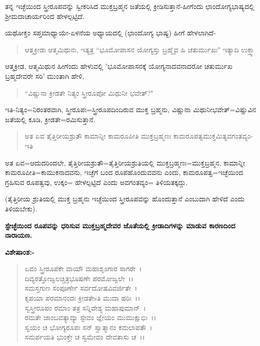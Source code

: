 ತನ್ನ ಇಚ್ಛೆಯಿಂದ ಸ್ತ್ರೀರೂಪವನ್ನು ಸ್ವೀಕರಿಸಿದ ಮುಕ್ತಬ್ರಹ್ಮನ ಜತೆಯಲ್ಲಿ ಕ್ರೀಡಿಸುತ್ತಾನೆ-ಹೀಗೆಂದು ಛಾಂದೋಗ್ಯಭಾಷ್ಯದಲ್ಲಿ ಶ‍್ರೀಮದಾಚಾರ್ಯರಿಂದ ಹೇಳಲ್ಪಟ್ಟಿದೆ.

ಯಥೋಕ್ತಂ ಸಪ್ತಮಾಧ್ಯಾಯೇ-ಏಳನೆಯ ಅಧ್ಯಾಯದಲ್ಲಿ (ಛಾಂದೋಗ್ಯ ಭಾಷ್ಯ) ಹೀಗೆ ಹೇಳಲಾಗಿದೆ-

\begin{verse}
ಆತ್ಮಕ್ರೀಡಃ ಆತ್ಮಮಿಥುನಃ, ಇತ್ಯತ್ರ “ಭೂಮೋಪಾಸನ ಯೋಗ್ಯಸ್ತು ಬ್ರಹ್ಮೈವ ಹಿ ಚತುರ್ಮುಖಃ" ಇತ್ಯಾದಿ ಉಕ್ತ್ವಾ
\end{verse}

ಆತ್ಮಕ್ರೀಡ, ಆತ್ಮಮಿಥುನ ಹೀಗೆಂದು ಹೇಳುವಲ್ಲಿ 'ಭೂಮೋಪಾಸನಕ್ಕೆ ಯೋಗ್ಯನಾದವನಾದರೋ ಚತುರ್ಮುಖ ಬ್ರಹ್ಮದೇವರೇ ಸರಿ' ಮುಂತಾಗಿ ಹೇಳಿ,

\begin{verse}
``ವಿಷ್ಣುನಾ ಕ್ರೀಡತೇ ನಿತ್ಯಂ ಸ್ತ್ರೀರೂಪೋ ಮಿಥುನೀ ಭವೇತ್?"
\end{verse}

ಇತಿ-ನಿತ್ಯಂ=ನಿರಂತರವಾಗಿ, ಸ್ತ್ರೀರೂಪಃ=ಸ್ತ್ರೀರೂಪದಿಂದಿರುವ ಮುಕ್ತ ಬ್ರಹ್ಮನು, ವಿಷ್ಣುನಾ ಮಿಥುನೀಭವೇತ್=ವಿಷ್ಣುವಿನ ಜತೆಯಲ್ಲಿ ಕೂಡಿ, ಕ್ರೀಡತೇ=ರಮಿಸುತ್ತಾನೆ.

\begin{verse}
ಅತ ಏವ ತೈತ್ತಿರೀಯಶ್ರುತೌ ಕಾಮಾನ್ನೀ ಕಾಮರೂಪೀತಿ ಮುಕ್ತಬ್ರಹ್ಮಣಃ ಕಾಮರೂಪತ್ವಮುಕ್ತಮಿತ್ಯವಗಂತವ್ಯಂ-ಇತಿ
\end{verse}

ಅತ ಏವ=ಆದುದರಿಂದಲೇ, ತೈತ್ತಿರೀಯಶ್ರುತೌ=ತೈತ್ತಿರೀಯಶ್ರುತಿಯಲ್ಲಿ ಮುಕ್ತಬ್ರಹ್ಮಣಃ=ಮುಕ್ತಬ್ರಹ್ಮನ, ಕಾಮಾನ್ನೀ ಕಾಮರೂಪೀತಿ=ಕಾಮುಕನಾದವನು, ಇಚ್ಛೆಗೆ ಬಂದ ರೂಪಹೊಂದುವವನು ಎಂದು, ಕಾಮರೂಪತ್ವ=ಇಚ್ಛೆಯಿಂದ ಗ್ರಹಿಸುವ ರೂಪತ್ವವು, ಉಕ್ಕಂ= ಹೇಳಲ್ಪಟ್ಟಿದೆ ಎಂದು ಅವಗಂತವ್ಯಂ= ತಿಳಿಯತಕ್ಕದ್ದು.

(ತೈತ್ತಿರೀಯ ಶ್ರುತಿಯಲ್ಲಿ ಮುಕ್ತ ಬ್ರಹ್ಮನು ಇಚ್ಛೆಯಿಂದ ಸ್ತ್ರೀರೂಪವನ್ನು ಹೊಂದುತ್ತಾನೆ ಎಂಬುದಾಗಿ ಹೇಳಿದೆ ಎಂದು ತಿಳಿಯಬೇಕು).

\begin{center}
\textbf{ಸ್ಟೇಚ್ಛೆಯಿಂದ ರೂಪವನ್ನು ಧರಿಸುವ ಮುಕ್ತಬ್ರಹ್ಮದೇವರ ಜೊತೆಯಲ್ಲಿ ಕ್ರೀಡಾದಿಗಳನ್ನು ಮಾಡುವ ಕಾರಣದಿಂದ ನಾರಾಯಣ.}
\end{center}

\noindent
\textbf{ವಿಶೇಷಾಂಶ:-}

\begin{verse}
ಏವಂ ಸ್ತ್ರೀರೂಪಕೇ ವಾಯೌ ಮಹಾಶೃಂಗಾರ ಸಾಗರೇ~।\\ ದಿವ್ಯರತ್ತೋಜ್ವಲಚ್ಚಿತ್ರಭೂಷಣೇ ಪರಮೋಜ್ವಲೇ~।।\\ ಸಮಸ್ತಗುಣ ಸಂಪೂರ್ಣೇ ಸರ್ವದೋಷವಿವರ್ಜಿತೇ~।\\ ಕೃಪಯಾ ಪರಮಾನಂದಃ ಕ್ರೀಡತೇsತಿ ಮುದಾ ಹರಿಃ~।।\\ ಸ್ವಸ್ತ್ರೀರೂಪಂ ರಮಾಂ ತತ್ರ ಸನ್ನಿವೇಶ್ಯ ಮಹಾಪುಮಾನ್~।\\ ರಮತೇ ಜಾಂಬವತ್ಯಾದ್ಯಾ ಸ್ಟೇವಂ ಜ್ಞೇಯಂ ಮುಮುಕ್ಷುಭಿಃ~।।\\ ಸ್ವಯಂ ಚ ಭೋಗ್ಯರೂಪಃ ಸನ್ ಸ್ವಾತ್ಮಾನಂ ಕಮಲಾಪತೌ~।\\ ಸಮರ್ಪಯತಿ ಭುಂಕ್ತೇ ಚ ಸ್ವಮೇವಂ ದೇವತಾಸು ಚ~।।
\end{verse}

